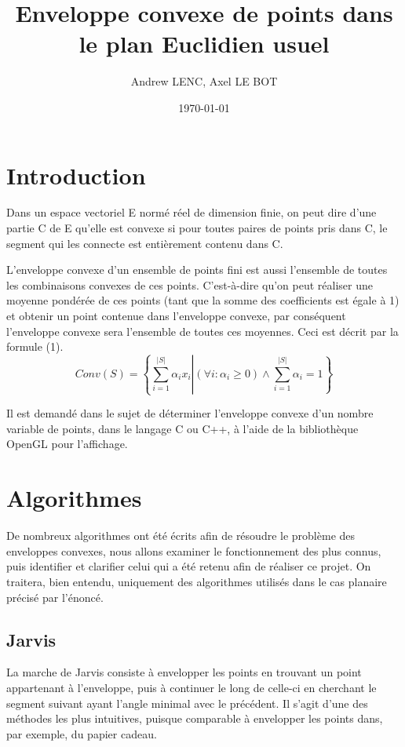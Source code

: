 \documentclass[final]{beamer}
\title
[Des enveloppes convexes, 2017-2018, Dijon, France] %
{ %
Enveloppe convexe de points dans le plan Euclidien usuel
}
\author{ %
Andrew LENC, Axel LE BOT
}
\institute
[Université de Bourgogne] %
{
ESIREM, France\\[0.3ex]
}
\date{\today}
\begin{document}
\begin{frame}[t]
\begin{multicols}{3}

\section{Introduction}

Dans un espace vectoriel E normé réel de dimension finie, on peut dire d'une partie C de E qu'elle est convexe si pour toutes paires de points pris dans C, le segment qui les connecte est entièrement contenu dans C.

L'enveloppe convexe d'un ensemble de points fini est aussi l'ensemble de toutes les combinaisons convexes de ces points. C'est-à-dire qu'on peut réaliser une moyenne pondérée de ces points (tant que la somme des coefficients est égale à 1) et obtenir un point contenue dans l'enveloppe convexe, par conséquent l'enveloppe convexe sera l'ensemble de toutes ces moyennes. Ceci est décrit par la formule (1).
\begin{equation}
Conv(S) = \left \{  \sum_{i=1}^{|S|} \alpha_{i}x_{i} \left | (\forall i : \alpha_{i} \geqslant 0) \wedge  \sum_{i=1}^{|S|} \alpha_{i} = 1 \right \}
\end{equation}

Il est demandé dans le sujet de déterminer l'enveloppe convexe d'un nombre variable de points, dans le langage C ou C++, à l'aide de la bibliothèque OpenGL pour l'affichage.

\section{Algorithmes}

De nombreux algorithmes ont été écrits afin de résoudre le problème des enveloppes convexes, nous allons examiner le fonctionnement des plus connus, puis identifier et clarifier celui qui a été retenu afin de réaliser ce projet. On traitera, bien entendu, uniquement des algorithmes utilisés dans le cas planaire précisé par l'énoncé.
\subsection{Jarvis}
La marche de Jarvis consiste à envelopper les points en trouvant un point appartenant à l'enveloppe, puis à continuer le long de celle-ci en cherchant le segment suivant ayant l'angle minimal avec le précédent. Il s'agit d'une des méthodes les plus intuitives, puisque comparable à envelopper les points dans, par exemple, du papier cadeau.


\end{multicols}
\end{frame}
\end{document}
